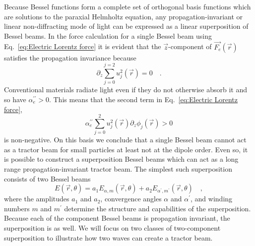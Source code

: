 Because Bessel functions form a complete set of orthogonal basis functions which are solutions to the paraxial Helmholtz equation, any propagation-invariant or linear non-diffracting mode of light can be expressed as a linear superposition \cite{Ruffner:14, Lee:10, ruffner2012prl} of Bessel beams. In the force calculation for a single Bessel beam using Eq.~\eqref{eq:Electric Lorentz force} it is evident that the $\vec{z}$-component of $\vec{F_e}(\vec{r})$ satisfies the propagation invariance because
\begin{equation}
\label{eq:Single Bessel gradient force}
\partial _{z} \sum ^{j=2}_{j=0} u_{j}^2(\vec{r}) = 0 \quad .
\end{equation}
Conventional materials radiate light even if they do not otherwise absorb it and so have $\alpha _{e}^{\prime \prime} > 0$. This means that the second term in Eq.~\eqref{eq:Electric Lorentz force},
\begin{equation}
\label{eq:Single Bessel 2nd term}
\alpha _{e}^{\prime\prime}\sum ^{2}_{j=0} u_{j}^2(\vec{r}) \partial _{z}\phi _{j}(\vec{r}) >0
\end{equation}
is non-negative. On this basis we conclude that a single Bessel beam cannot act as a tractor beam for small particles at least not at the dipole order. Even so, it is possible to construct a superposition Bessel beams which can act as a long range propagation-invariant tractor beam. The simplest such superposition consists of two Bessel beams
\begin{equation}
\label{eq:two bessel superposition E}
E(\vec{r}, \theta) = a_{1} E_{\alpha, m}(\vec{r},\theta) + a_{2} E_{\alpha ^{\prime},m^{\prime}}(\vec{r},\theta) \quad ,
\end{equation}
where the amplitudes $a_1$ and $a_2$, convergence angles $\alpha$ and $\alpha ^{\prime}$, and winding numbers $m$ and $m^{\prime}$ determine the structure and capabilities of the superposition. Because each of the component Bessel beams is propagation invariant, the superposition is as well. We will focus on two classes of two-component superposition to illustrate how two  waves can create a tractor beam.



